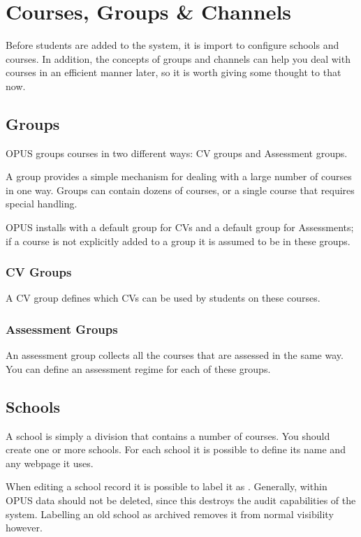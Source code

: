 \documentclass[12 pt]{book}
\begin{document}
\chapter{Courses, Groups \& Channels}

Before students are added to the system, it is import to configure schools and
courses. In addition, the concepts of groups and channels can help you deal
with courses in an efficient manner later, so it is worth giving some thought
to that now.

\section{Groups}

OPUS groups courses in two different ways: CV groups and Assessment groups.

A group provides a simple mechanism for dealing with a large number of courses
in one way. Groups can contain dozens of courses, or a single course that
requires special handling.

OPUS installs with a default group for CVs and a default group for Assessments;
if a course is not explicitly added to a group it is assumed to be in these
groups.

\subsection{CV Groups}

A CV group defines which CVs can be used by students on these courses.

\subsection{Assessment Groups}

An assessment group collects all the courses that are assessed in the same way.
You can define an assessment regime for each of these groups.

\section{Schools}

A school is simply a division that contains a number of courses. You should 
create one or more schools. For each school it is possible to define its name
and any webpage it uses.

When editing a school record it is possible to label it as . Generally,
within OPUS data should not be deleted, since this destroys the audit capabilities
of the system. Labelling an old school as archived removes it from normal visibility
however.
\end{document}
